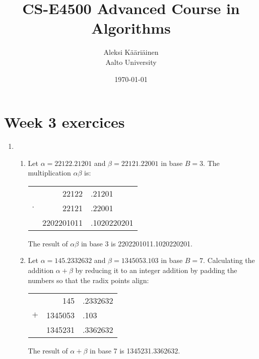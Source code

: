 \documentclass[11pt,a4paper]{article}
\title{CS-E4500 Advanced Course in Algorithms}
\author{Aleksi Kääriäinen  \\
	Aalto University  \\
	}
\begin{document}
\date{\today}

\maketitle

\newpage

\section*{Week 3 exercices}

\begin{enumerate}
    \item
          \begin{enumerate}
              \item Let $\alpha= 22122.21201$ and $\beta = 22121.22001$ in base $B = 3$. The multiplication $\alpha \beta$ is:
                    \begin{center}
                        \begin{tabular}{crl}
                                    & 22122      & .21201      \\
                            $\cdot$ & 22121      & .22001      \\
                            \hline
                                    & 2202201011 & .1020220201 \\
                        \end{tabular}
                    \end{center}
                    The result of $\alpha \beta$ in base 3 is 2202201011.1020220201.

              \item Let $\alpha = 145.2332632$ and $\beta = 1345053.103$ in base $B = 7$. Calculating the addition $\alpha + \beta$
                    by reducing it to an integer addition by padding the numbers so that the radix points align:
                    \begin{center}
                        \begin{tabular}{crl}
                                & 145     & .2332632 \\
                            $+$ & 1345053 & .103     \\
                            \hline
                                & 1345231 & .3362632 \\
                        \end{tabular}
                    \end{center}
                    The result of $\alpha + \beta$ in base 7 is 1345231.3362632.
          \end{enumerate}
          \newpage


\end{enumerate}
\end{document}
